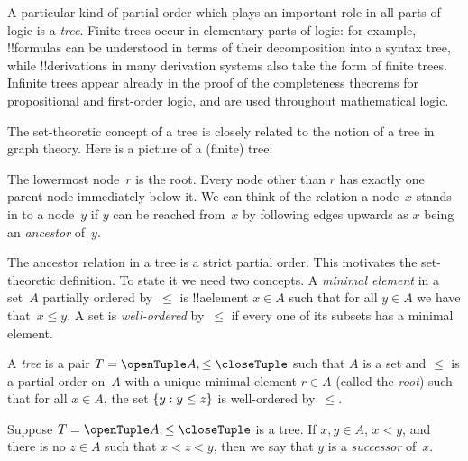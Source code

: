 \documentclass[../../../include/open-logic-section]{subfiles}
\begin{document}

A particular kind of partial order which plays an important role in
all parts of logic is a \emph{tree}. Finite trees occur in elementary
parts of logic: for example, !!{formula}s can be understood in terms
of their decomposition into a syntax tree, while !!{derivation}s in
many derivation systems also take the form of finite trees.
%
Infinite trees appear already in the proof of the completeness
theorems for propositional and first-order logic, and are used
throughout mathematical logic.

The set-theoretic concept of a tree is closely related to the notion
of a tree in graph theory. Here is a picture of a (finite) tree:

\begin{center}
\end{center}

The lowermost node~$r$ is the root. Every node other than $r$ has
exactly one parent node immediately below it. We can think of the relation
a node~$x$ stands in to a node~$y$ if $y$ can be reached from~$x$ by
following edges upwards as $x$ being an \emph{ancestor} of~$y$. 

The ancestor relation in a tree is a strict partial order. This
motivates the set-theoretic definition. To state it we need two
concepts. A \emph{minimal element} in a set~$A$ partially ordered
by~$\le$ is !!a{element} $x \in A$ such that for all $y \in A$ we have
that~$x \le y$. A set is \emph{well-ordered} by~$\le$ if every one of
its subsets has a minimal element.

\begin{defn}[Tree]
A \emph{tree} is a pair $T = \tuple{A, \le}$ such that $A$ is a set
and $\le$ is a partial order on~$A$ with a unique minimal element
$r \in A$ (called the \emph{root}) such that for all $x \in A$,
the set $\{ y : y \le z \}$ is well-ordered by~$\le$.
\end{defn}

\begin{defn}[Successors]
Suppose $T = \tuple{A, \le}$ is a tree.
If $x,y \in A$, $x < y$, and there is no $z \in A$ such that
$x < z < y$, then we say that $y$ is a \emph{successor} of~$x$.
\end{defn}
\end{document}
